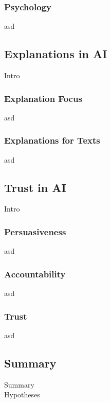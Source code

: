 \subsubsection{Psychology}
asd



\subsection{Explanations in AI}
Intro

\subsubsection{Explanation Focus}
asd

\subsubsection{Explanations for Texts}
asd



\subsection{Trust in AI}
Intro

\subsubsection{Persuasiveness}
asd

\subsubsection{Accountability}
asd

\subsubsection{Trust}
asd



\subsection{Summary}
Summary\\
Hypotheses
